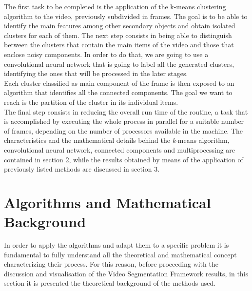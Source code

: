 \documentclass{usiinftr}
\begin{document}
The first task to be completed is the application of the k-means clustering algorithm to the video, previously subdivided in frames. The goal is to be able to identify the main features among other secondary objects and obtain isolated clusters for each of them.
\newpage
\noindent
The next step consists in being able to distinguish between the clusters that contain the main items of the video and those that enclose  noisy components. In order to do that, we are going to use a convolutional neural network that is going to label all the generated clusters, identifying the ones that will be processed in the later stages. \\
 Each cluster classified as main component of the frame is then exposed to an algorithm that identifies all the connected components. The goal we want to reach is the partition of the cluster in its individual items.  \\
 The final step consists in reducing the overall run time of the routine, a task that is accomplished by executing the whole process in parallel for a suitable number of frames, depending on the number of processors available in the machine.
 The characteristics and the mathematical details behind the \textit{k}-means algorithm, convolutional neural network, connected components and multiprocessing are contained in section 2, while the results obtained by means of the application of previously listed methods are discussed in section 3.  \\
 
 
\section{Algorithms and Mathematical Background}
In order to apply the algorithms and adapt them to a specific problem it is fundamental to fully understand all the theoretical and mathematical concept characterizing their process. For this reason, before proceeding with the discussion and visualisation of the Video Segmentation Framework results, in this section it is presented the theoretical background of the methods used.
\end{document}
